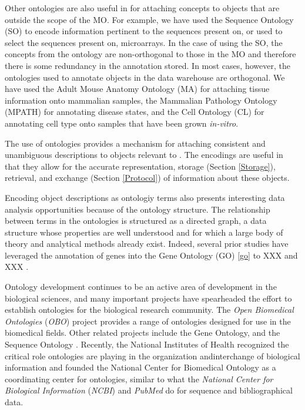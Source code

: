 Other ontologies are also useful in \dbthesis for attaching concepts to objects
that are outside the scope of the MO.  For example, we have used the Sequence
Ontology (SO) \cite{so} to encode information pertinent to the sequences
present on, or used to select the sequences present on, microarrays.  In
the case of using the SO, the concepts from the ontology are non-orthogonal to
those in the MO and therefore there is some redundancy in the annotation
stored.  In most cases, however, the ontologies used to annotate objects in the
data warehouse are orthogonal.  We have used the Adult Mouse Anatomy Ontology
(MA) \cite{ma} for attaching tissue information onto mammalian samples, the
Mammalian Pathology Ontology (MPATH) \cite{mpath} for annotating disease
states, and the Cell Ontology (CL) \cite{cl} for annotating cell type onto
samples that have been grown \emph{in-vitro}.

The use of ontologies provides a mechanism for attaching consistent and
unambiguous descriptions to objects relevant to \dbthesis.  The encodings are
useful in that they allow for the accurate representation, storage (Section
\ref{Storage}), retrieval, and exchange (Section \ref{Protocol}) of information
about these objects.

Encoding object descriptions as ontologiy terms also presents interesting
data analysis opportunities because of the ontology structure.   The
relationship between terms in the ontologies is structured as a directed graph,
a data structure whose properties are well understood and for which a large
body of theory and analytical methods already exist.  Indeed, several prior
studies have leveraged the annotation of genes into the Gene Ontology (GO)
\ref{go} to XXX and XXX \cite{XXX,XXX}.

Ontology development continues to be an active area of development in the
biological sciences, and many important projects have spearheaded the effort to
establish ontologies for the biological research community.  The \emph{Open
Biomedical Ontologies} (\emph{OBO}) project provides a range of ontologies
designed for use in the biomedical fields.  Other related projects include the
Gene Ontology, and the Sequence Ontology \cite{go,so}.  Recently, the National
Institutes of Health recognized the critical role ontologies are playing in the
organization andinterchange of biological information and founded the National
Center for Biomedical Ontology \cite{ncbo} as a coordinating center for
ontologies, similar to what the \emph{National Center for Biological
Information} (\emph{NCBI}) \cite{ncbi} and \emph{PubMed} \cite{pubmed} do for
sequence and bibliographical data.

